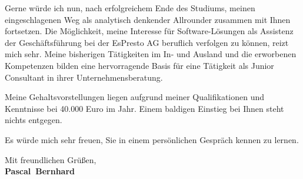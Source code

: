 \documentclass[11pt,a4paper]{article}
\def\firstname{Pascal}
\def\familyname{Bernhard}
\begin{document}
Gerne würde ich nun, nach erfolgreichem Ende des Studiums, meinen eingeschlagenen Weg als analytisch denkender Allrounder zusammen mit Ihnen fortsetzen.
Die Möglichkeit, meine Interesse für Software-Lösungen als Assistenz der Geschäftsführung bei der EsPresto AG beruflich verfolgen zu können, reizt mich sehr. Meine bisherigen Tätigkeiten im In- und Ausland und die erworbenen Kompetenzen bilden eine hervorragende Basis für eine Tätigkeit als Junior Consultant in ihrer Unternehmensberatung.


Meine Gehaltsvorstellungen liegen aufgrund meiner Qualifikationen und Kenntnisse bei 40.000 Euro im Jahr. Einem baldigen Einstieg bei Ihnen steht nichts entgegen.


Es würde mich sehr freuen, Sie in einem persönlichen Gespräch kennen zu lernen.

  
Mit freundlichen Grüßen,\\[3em] %
%
{\bfseries \firstname~\familyname}\\
%
\end{document}

